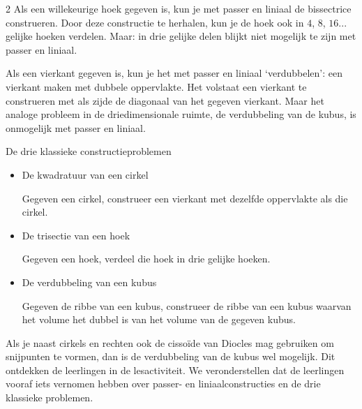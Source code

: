 \begin{multicols}{2}
Als een willekeurige hoek gegeven is, kun je met passer en liniaal de bissectrice construeren. Door deze constructie te herhalen, kun je de hoek ook in $4$, $8$, $16$... gelijke hoeken verdelen. Maar: in drie gelijke delen blijkt niet mogelijk te zijn met passer en liniaal.

Als een vierkant gegeven is, kun je het met passer en liniaal `verdubbelen': een vierkant maken met dubbele oppervlakte. Het volstaat een vierkant te construeren met als zijde de diagonaal van het gegeven vierkant. Maar het analoge probleem in de driedimensionale ruimte, de verdubbeling van de kubus, is onmogelijk met passer en liniaal.

\begin{kader}{}{De drie klassieke constructieproblemen}

\begin{itemize}
\item De kwadratuur van een cirkel


Gegeven een cirkel, construeer een vierkant met dezelfde oppervlakte als die cirkel.

\item De trisectie van een hoek

Gegeven een hoek, verdeel die hoek in drie gelijke hoeken.

\item De verdubbeling van een kubus


Gegeven de ribbe van een kubus, construeer de ribbe van een kubus waarvan het volume het dubbel is van het volume van de gegeven kubus.

\end{itemize}


\end{kader}

Als je naast cirkels en rechten ook de cissoïde van Diocles mag gebruiken om snijpunten te vormen, dan is de verdubbeling van de kubus wel mogelijk. Dit ontdekken de leerlingen in de lesactiviteit. We veronderstellen dat de leerlingen vooraf iets vernomen hebben over passer- en liniaalconstructies en de drie klassieke problemen.

\end{multicols}

